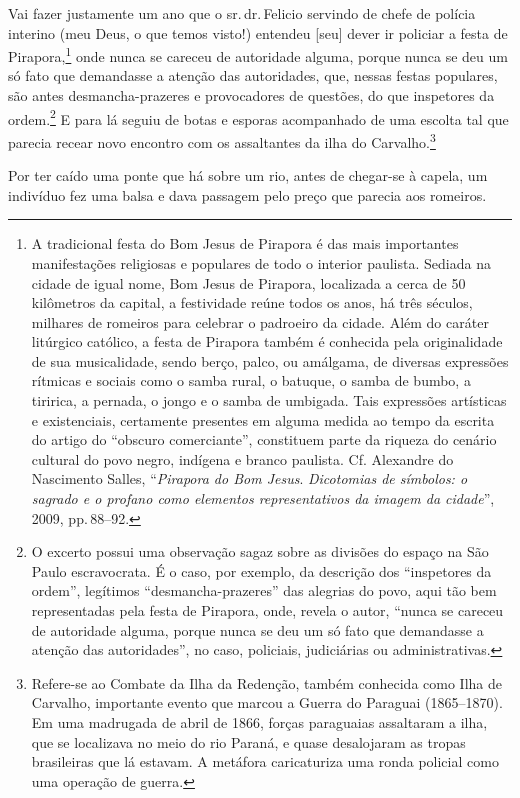 Vai fazer justamente um ano que o sr.\,dr.\,Felicio servindo de chefe de
polícia interino (meu Deus, o que temos visto!) entendeu {[}seu{]} dever
ir policiar a festa de Pirapora,\footnote{ A tradicional festa do Bom
  Jesus de Pirapora é das mais importantes manifestações religiosas e
  populares de todo o interior paulista. Sediada na cidade de igual
  nome, Bom Jesus de Pirapora, localizada a cerca de 50 kilômetros da
  capital, a festividade reúne todos os anos, há três séculos, milhares
  de romeiros para celebrar o padroeiro da cidade. Além do caráter
  litúrgico católico, a festa de Pirapora também é conhecida pela
  originalidade de sua musicalidade, sendo berço, palco, ou amálgama, de
  diversas expressões rítmicas e sociais como o samba rural, o batuque,
  o samba de bumbo, a tiririca, a pernada, o jongo e o samba de
  umbigada. Tais expressões artísticas e existenciais, certamente
  presentes em alguma medida ao tempo da escrita do artigo do ``obscuro
  comerciante'', constituem parte da riqueza do cenário cultural do povo
  negro, indígena e branco paulista. Cf. Alexandre do Nascimento Salles,
  ``\emph{Pirapora do Bom Jesus}. \emph{Dicotomias de símbolos: o sagrado
  e o profano como elementos representativos da imagem da cidade}'',
  2009, pp.\,88--92.} onde nunca se careceu de autoridade alguma, porque
nunca se deu um só fato que demandasse a atenção das autoridades, que,
nessas festas populares, são antes desmancha-prazeres e provocadores de
questões, do que inspetores da ordem.\footnote{ O excerto possui uma
  observação sagaz sobre as divisões do espaço na São Paulo
  escravocrata. É o caso, por exemplo, da descrição dos ``inspetores da
  ordem'', legítimos ``desmancha-prazeres'' das alegrias do povo, aqui tão
  bem representadas pela festa de Pirapora, onde, revela o autor, ``nunca
  se careceu de autoridade alguma, porque nunca se deu um só fato que
  demandasse a atenção das autoridades'', no caso, policiais, judiciárias
  ou administrativas.} E para lá seguiu de botas e esporas acompanhado
de uma escolta tal que parecia recear novo encontro com os assaltantes
da ilha do Carvalho.\footnote{ Refere-se ao Combate da Ilha da
  Redenção, também conhecida como Ilha de Carvalho, importante evento
  que marcou a Guerra do Paraguai (1865--1870). Em uma madrugada de abril
  de 1866, forças paraguaias assaltaram a ilha, que se localizava no
  meio do rio Paraná, e quase desalojaram as tropas brasileiras que lá
  estavam. A metáfora caricaturiza uma ronda policial como uma operação
  de guerra.}

Por ter caído uma ponte que há sobre um rio, antes de chegar-se à
capela, um indivíduo fez uma balsa e dava passagem pelo preço que
parecia aos romeiros.

